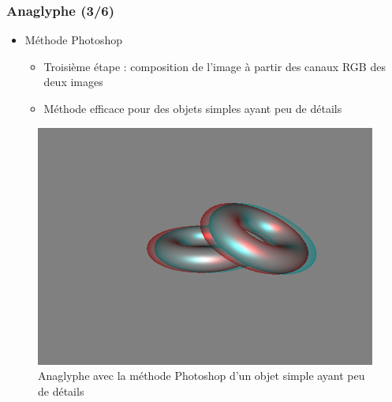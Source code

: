 \documentclass{beamer}
\begin{document}
%
\begin{frame}
\frametitle{Anaglyphe (3/6)}
\begin{itemize}[label=$\bullet$]
\item Méthode Photoshop \cite{stereoAnaglyph}
	\begin{itemize}[label=$\circ$]
	\item Troisième étape : composition de l'image à partir des canaux RGB des deux images
	\item Méthode efficace pour des objets simples ayant peu de détails
	\end{itemize}
\end{itemize}
\begin{figure}
\centering
\includegraphics[scale=0.28]{donuts_photoshop.png}
\caption{Anaglyphe avec la méthode Photoshop d'un objet simple ayant peu de détails }
\end{figure}


\end{frame}
\end{document}
